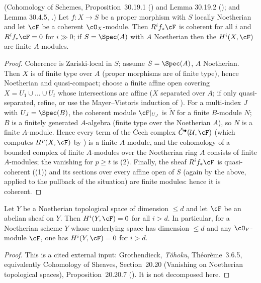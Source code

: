 \begin{lemma}
\label{lem:pc-coherent-hi}
(Cohomology of Schemes, Proposition~30.19.1 () and Lemma 30.19.2
(); and Lemma
30.4.5, .)
Let $f:X\to S$ be a proper morphism with $S$ locally Noetherian and let
$\cF$ be a coherent $\cO_X$-module.  Then $R^if_*\cF$ is coherent for all
$i$ and $R^if_*\cF=0$ for $i\gg0$; if $S=\Spec(A)$ with $A$ Noetherian
then the $H^i(X,\cF)$ are finite $A$-modules.
\end{lemma}
\begin{proof}
Coherence is Zariski-local in $S$; assume $S=\Spec(A)$, $A$ Noetherian.
Then $X$ is of finite type over $A$ (proper morphisms are of finite
type), hence Noetherian and quasi-compact; choose a finite affine open
covering $X=U_1\cup\dots\cup U_t$ whose intersections are affine
($X$ separated over $A$; if only quasi-separated, refine, or use the
Mayer--Vietoris induction of ).
For a multi-index $J$ with $U_J=\Spec(B)$, the coherent module
$\cF|_{U_J}$ is $\widetilde N$ for a finite $B$-module $N$; $B$ is a
finitely generated $A$-algebra (finite type over the Noetherian $A$),
so $N$ is a finite $A$-module.  Hence every term of the Čech complex
$\check C^\bullet(\mathcal U,\cF)$ (which computes $H^p(X,\cF)$ by
) is a finite $A$-module, and the
cohomology of a bounded complex of finite $A$-modules over the
Noetherian ring $A$ consists of finite $A$-modules; the vanishing for
$p\ge t$ is (2).  Finally, the
sheaf $R^if_*\cF$ is quasi-coherent
((1)) and its sections over every
affine open of $S$ (again by the above, applied to the pullback of
the situation) are finite modules: hence it is coherent.
\end{proof}

\begin{lemma}\label{lem:pc-grothendieck-vanishing}
Let $Y$ be a Noetherian topological space of dimension $\le d$ and let $\cF$ be an abelian
sheaf on $Y$.  Then $H^i(Y,\cF)=0$ for all $i>d$.  In particular, for a Noetherian scheme $Y$
whose underlying space has dimension $\le d$ and any $\cO_Y$-module $\cF$, one has
$H^i(Y,\cF)=0$ for $i>d$.
\end{lemma}
\begin{proof}
This is a cited external input: Grothendieck, \emph{Tôhoku}, Théorème~3.6.5, equivalently
Cohomology of Sheaves, Section~20.20 (Vanishing on Noetherian topological spaces),
Proposition~20.20.7 ().  It is not decomposed here.
\end{proof}

